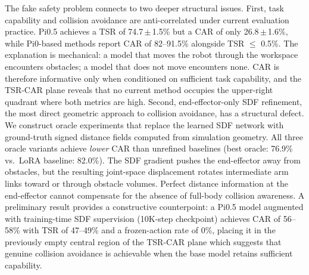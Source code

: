 The fake safety problem connects to two deeper structural issues. First, task capability and collision avoidance are anti-correlated under current evaluation practice. Pi0.5 achieves a TSR of 74.7\,$\pm$\,1.5\% but a CAR of only 26.8\,$\pm$\,1.6\%, while Pi0-based methods report CAR of 82--91.5\% alongside TSR $\leq$ 0.5\%. The explanation is mechanical: a model that moves the robot through the workspace encounters obstacles; a model that does not move encounters none. CAR is therefore informative only when conditioned on sufficient task capability, and the TSR-CAR plane reveals that no current method occupies the upper-right quadrant where both metrics are high. Second, end-effector-only SDF refinement, the most direct geometric approach to collision avoidance, has a structural defect. We construct oracle experiments that replace the learned SDF network with ground-truth signed distance fields computed from simulation geometry. All three oracle variants achieve \emph{lower} CAR than unrefined baselines (best oracle: 76.9\% vs.\ LoRA baseline: 82.0\%). The SDF gradient pushes the end-effector away from obstacles, but the resulting joint-space displacement rotates intermediate arm links toward or through obstacle volumes. Perfect distance information at the end-effector cannot compensate for the absence of full-body collision awareness. A preliminary result provides a constructive counterpoint: a Pi0.5 model augmented with training-time SDF supervision (10K-step checkpoint) achieves CAR of 56--58\% with TSR of 47--49\% and a frozen-action rate of 0\%, placing it in the previously empty central region of the TSR-CAR plane which suggests that genuine collision avoidance is achievable when the base model retains sufficient capability.

